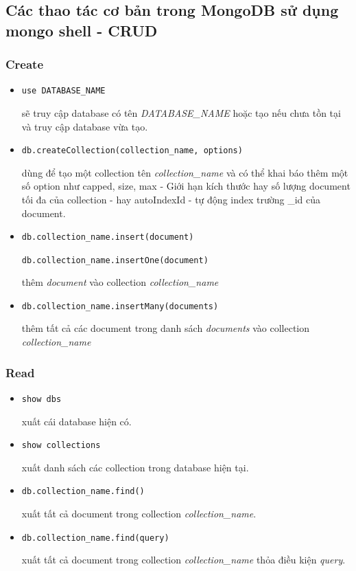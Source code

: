 \subsection{Các thao tác cơ bản trong MongoDB sử dụng mongo shell - CRUD} \label{ssec:MongoDB.3}
\subsubsection{Create}
\begin{itemize}
\item 
\begin{lstlisting} 
use DATABASE_NAME
\end{lstlisting}
sẽ truy cập database có tên \textit{DATABASE\_NAME} hoặc tạo nếu chưa tồn tại và truy cập database vừa tạo.
\item 
\begin{lstlisting}
db.createCollection(collection_name, options)
\end{lstlisting}
dùng để tạo một collection tên \textit{collection\_name} và có thể khai báo thêm một số option như capped, size, max - Giới hạn kích thước hay số lượng document tối đa của collection - hay autoIndexId - tự động index trường \_id của document.
\item
\begin{lstlisting}
db.collection_name.insert(document)

db.collection_name.insertOne(document)
\end{lstlisting}
thêm \textit{document} vào collection \textit{collection\_name}
\item
\begin{lstlisting}
db.collection_name.insertMany(documents)
\end{lstlisting}
thêm tất cả các document trong danh sách \textit{documents} vào collection \textit{collection\_name}
\end{itemize}
\subsubsection{Read}
\begin{itemize}
\item
\begin{lstlisting}
show dbs
\end{lstlisting}
xuất cái database hiện có.
\item
\begin{lstlisting}
show collections
\end{lstlisting}
xuất danh sách các collection trong database hiện tại.
\item
\begin{lstlisting}
db.collection_name.find()
\end{lstlisting}
xuất tất cả document trong collection \textit{collection\_name}.
\item
\begin{lstlisting}
db.collection_name.find(query)
\end{lstlisting}
xuất tất cả document trong collection \textit{collection\_name} thỏa điều kiện \textit{query}.
\end{itemize}
